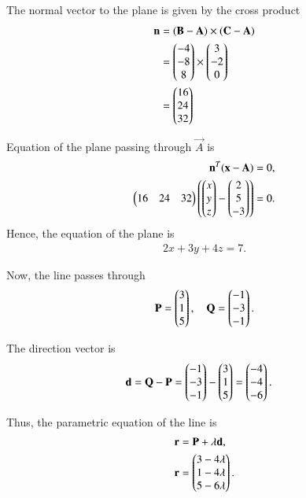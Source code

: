 \documentclass[journal]{IEEEtran}
\begin{document}
The normal vector to the plane is given by the cross product
\begin{align}
\mathbf{n} &= (\mathbf{B} - \mathbf{A} ) \times (\mathbf{C} - \mathbf{A})\\
&= \begin{pmatrix}-4 \\ -8 \\ 8\end{pmatrix} \times \begin{pmatrix}3 \\ -2 \\ 0\end{pmatrix}\nonumber\\
&= \begin{pmatrix}16 \\ 24 \\ 32\end{pmatrix}\nonumber
\end{align}

Equation of the plane passing through $\vec{A}$ is
\begin{align}
\mathbf{n}^{T} (\mathbf{x} - \mathbf{A}) &= 0, \\
\begin{pmatrix}16 & 24 & 32\end{pmatrix} \left( \begin{pmatrix}x \\ y \\ z\end{pmatrix} - \begin{pmatrix}2 \\ 5 \\ -3\end{pmatrix} \right) &= 0.\nonumber
\end{align}
Hence, the equation of the plane is
\begin{align}
2x + 3y + 4z = 7.
\end{align}

Now, the line passes through 
\begin{align}
  \mathbf{P} = \begin{pmatrix}3 \\ 1 \\ 5\end{pmatrix}, \quad \mathbf{Q} = \begin{pmatrix}-1 \\ -3 \\ -1\end{pmatrix}.  
\end{align}


The direction vector is
\begin{align}
\mathbf{d} &= \mathbf{Q} - \mathbf{P} = \begin{pmatrix}-1 \\ -3 \\ -1\end{pmatrix} - \begin{pmatrix}3 \\ 1 \\ 5\end{pmatrix} 
= \begin{pmatrix}-4 \\ -4 \\ -6\end{pmatrix}.
\end{align}

Thus, the parametric equation of the line is
\begin{align}
\mathbf{r} &= \mathbf{P} + \lambda \mathbf{d}, \\
\mathbf{r} &= \begin{pmatrix}3 - 4\lambda \\ 1 - 4\lambda \\ 5 - 6\lambda\end{pmatrix}.
\end{align}
\end{document}
